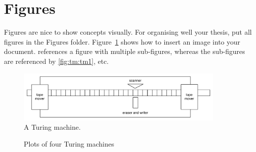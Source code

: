 \section{Figures}
Figures are nice to show concepts visually. For organising well your thesis, put all figures in the Figures folder. Figure~\ref{fig:machine} shows how to insert an image into your document.  references a figure with multiple sub-figures, whereas the sub-figures are referenced by \cref{fig:tm:tm1}, etc. 

\begin{figure}
\centering
\includegraphics[width=0.9\textwidth]{turingmachine}
\caption{A Turing machine.}
\label{fig:machine}
\end{figure}


\begin{figure}
\centering
{}
\caption{Plots of four Turing machines}
\label{fig:tm}
\end{figure}




